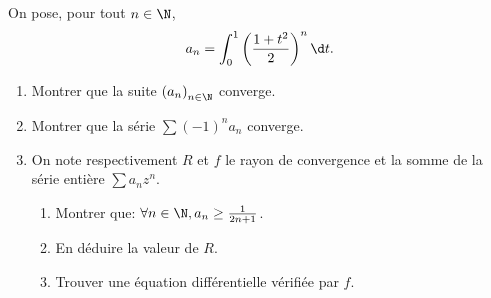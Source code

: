 \begin{enonce}
\begin{exercise}[ID={RMS132 E1170},subtitle={CCINP PSI 2021},tags={}, difficulty={0}]
On pose, pour tout $n\in\N$,
\begin{equation*}
  a_n = \int_0^1 \left( \frac{1+t^2}{2} \right)^n \d t. 
\end{equation*}
\begin{enumerate}
  \item Montrer que la suite $\left( a_n \right)_{n\in\N}$ converge.
  \item Montrer que la série $\sum (-1)^n a_n$ converge.
  \item On note respectivement $R$ et $f$ le rayon de convergence et la somme de la série entière $\sum a_n z^n$.
    \begin{enumerate}
      \item Montrer que: $\forall n\in\N, a_n \geq \frac{1}{2n+1}$.
      \item En déduire la valeur de $R$.
      \item Trouver une équation différentielle vérifiée par $f$.
    \end{enumerate}
\end{enumerate}
\end{exercise}
\begin{solution}
\end{solution}
\end{enonce}
